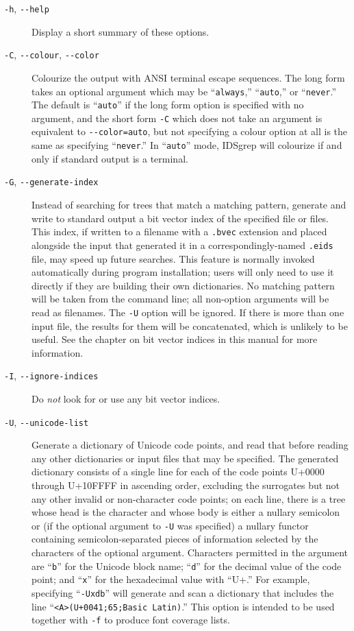 \documentclass[twocolumn]{report}
\newcommand{\DangerousBend}{\marginpar{\large\hfill\dbend\hfill\null}}
\begin{document}
\begin{description}
\item[\texttt{-h}, \texttt{-{}-help}] Display a short summary of these
options.

\item[\texttt{-C}, \texttt{-{}-colour}, \texttt{-{}-color}] Colourize the
output with ANSI terminal escape sequences.  The long form takes an optional
argument which may be ``\texttt{always},'' ``\texttt{auto},'' or
``\texttt{never}.'' The default is ``\texttt{auto}'' if the long form option
is specified with no argument, and the short form \texttt{-C} which does not
take an argument is equivalent to \texttt{-{}-color=auto}, but not
specifying a colour option at all is the same as specifying
``\texttt{never}.'' In ``\texttt{auto}'' mode, IDSgrep will colourize if and
only if standard output is a terminal.

\item[\texttt{-G}, \texttt{-{}-generate-index}]
Instead \DangerousBend of searching for trees that match a matching
pattern, generate and
write to standard output a bit vector index of the specified file or files.
This index, if written to a filename with a \texttt{.bvec} extension and
placed alongside the input that generated it in a correspondingly-named
\texttt{.eids} file, may speed up future searches.
This feature is normally invoked automatically during program installation;
users will only need to use it directly if they are building their own
dictionaries.  No
matching pattern will be taken from the command line; all non-option
arguments will be read as filenames.  The \texttt{-U} option will be
ignored.  If there is more than one input file, the results for them will be
concatenated, which is unlikely to be useful.  See the chapter on bit vector
indices in this manual for more information.

\item[\texttt{-I}, \texttt{-{}-ignore-indices}]
Do \emph{not} look for or use any bit vector indices.

\item[\texttt{-U}, \texttt{-{}-unicode-list}] Generate a dictionary of Unicode
code points, and read that before reading any other dictionaries or input
files that may be specified.  The generated dictionary consists of a single
line for each of the code points U+0000 through U+10FFFF in ascending order,
excluding the surrogates but not any other invalid or non-character code
points; on each line, there is a tree whose head is the character and whose
body is either a nullary semicolon or (if the optional argument to
\texttt{-U} was specified) a nullary functor containing semicolon-separated
pieces of information selected by the characters of the optional argument. 
Characters permitted in the argument are ``\texttt{b}'' for the Unicode
block name; ``\texttt{d}'' for the decimal value of the code point; and
``\texttt{x}'' for the hexadecimal value with ``U+.'' For example,
specifying ``\texttt{-Uxdb}'' will generate and scan a dictionary that
includes the line ``\texttt{<A>(U+0041;65;Basic Latin)}.'' This option is
intended to be used together with \texttt{-f} to produce font coverage
lists.


\end{description}
\end{document}
